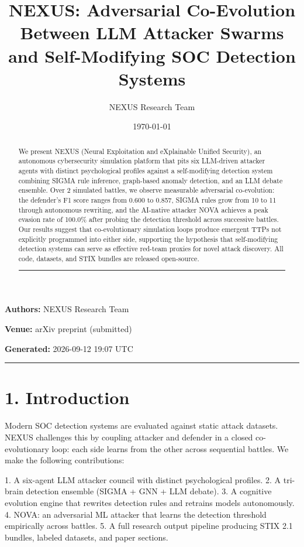 \documentclass{article}
\title{NEXUS: Adversarial Co-Evolution Between LLM Attacker Swarms and Self-Modifying SOC Detection Systems}
\author{NEXUS Research Team}
\date{\today}
\begin{document}
\maketitle


\textbf{Authors:} NEXUS Research Team  

\textbf{Venue:} arXiv preprint (submitted)  

\textbf{Generated:} 2026-09-12 19:07 UTC  

\hrule\vspace{6pt}

\begin{abstract}

We present NEXUS (Neural Exploitation and eXplainable Unified Security), an autonomous cybersecurity simulation platform that pits six LLM-driven attacker agents with distinct psychological profiles against a self-modifying detection system combining SIGMA rule inference, graph-based anomaly detection, and an LLM debate ensemble. Over 2 simulated battles, we observe measurable adversarial co-evolution: the defender's F1 score ranges from 0.600 to 0.857, SIGMA rules grow from 10 to 11 through autonomous rewriting, and the AI-native attacker NOVA achieves a peak evasion rate of 100.0\% after probing the detection threshold across successive battles. Our results suggest that co-evolutionary simulation loops produce emergent TTPs not explicitly programmed into either side, supporting the hypothesis that self-modifying detection systems can serve as effective red-team proxies for novel attack discovery. All code, datasets, and STIX bundles are released open-source.


\hrule\vspace{6pt}

\end{abstract}

\section{1. Introduction}

Modern SOC detection systems are evaluated against static attack datasets. NEXUS challenges this by coupling attacker and defender in a closed co-evolutionary loop: each side learns from the other across sequential battles. We make the following contributions:

1. A six-agent LLM attacker council with distinct psychological profiles.
2. A tri-brain detection ensemble (SIGMA + GNN + LLM debate).
3. A cognitive evolution engine that rewrites detection rules and retrains models autonomously.
4. NOVA: an adversarial ML attacker that learns the detection threshold empirically across battles.
5. A full research output pipeline producing STIX 2.1 bundles, labeled datasets, and paper sections.
\end{document}
